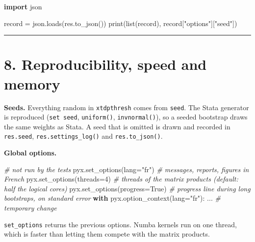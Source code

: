 \documentclass[
  10.5pt,
  a4paper,
]{article}
\newenvironment{Shaded}{}{}
\newcommand{\BuiltInTok}[1]{\textcolor[rgb]{0.00,0.50,0.00}{#1}}
\newcommand{\CommentTok}[1]{\textcolor[rgb]{0.38,0.63,0.69}{\textit{#1}}}
\newcommand{\ControlFlowTok}[1]{\textcolor[rgb]{0.00,0.44,0.13}{\textbf{#1}}}
\newcommand{\DecValTok}[1]{\textcolor[rgb]{0.25,0.63,0.44}{#1}}
\newcommand{\ImportTok}[1]{\textcolor[rgb]{0.00,0.50,0.00}{\textbf{#1}}}
\newcommand{\NormalTok}[1]{#1}
\newcommand{\OperatorTok}[1]{\textcolor[rgb]{0.40,0.40,0.40}{#1}}
\newcommand{\StringTok}[1]{\textcolor[rgb]{0.25,0.44,0.63}{#1}}
\newcommand{\VariableTok}[1]{\textcolor[rgb]{0.10,0.09,0.49}{#1}}
\begin{document}
\begin{Shaded}
\begin{Highlighting}[]
\ImportTok{import}\NormalTok{ json}

\NormalTok{record }\OperatorTok{=}\NormalTok{ json.loads(res.to\_json())}
\BuiltInTok{print}\NormalTok{(}\BuiltInTok{list}\NormalTok{(record), record[}\StringTok{"options"}\NormalTok{][}\StringTok{"seed"}\NormalTok{])}
\end{Highlighting}
\end{Shaded}

\begin{center}\rule{0.5\linewidth}{0.5pt}\end{center}

\section{8. Reproducibility, speed and
memory}\label{reproducibility-speed-and-memory}

\textbf{Seeds.} Everything random in \texttt{xtdpthresh} comes from
\texttt{seed}. The Stata generator is reproduced (\texttt{set\ seed},
\texttt{uniform()}, \texttt{invnormal()}), so a seeded bootstrap draws
the same weights as Stata. A seed that is omitted is drawn and recorded
in \texttt{res.seed}, \texttt{res.settings\_log()} and
\texttt{res.to\_json()}.

\textbf{Global options.}

\begin{Shaded}
\begin{Highlighting}[]
\CommentTok{\# not run by the tests}
\NormalTok{pyx.set\_options(lang}\OperatorTok{=}\StringTok{"fr"}\NormalTok{)  }\CommentTok{\# messages, reports, figures in French}
\NormalTok{pyx.set\_options(threads}\OperatorTok{=}\DecValTok{4}\NormalTok{)  }\CommentTok{\# threads of the matrix products (default: half the logical cores)}
\NormalTok{pyx.set\_options(progress}\OperatorTok{=}\VariableTok{True}\NormalTok{)  }\CommentTok{\# progress line during long bootstraps, on standard error}
\ControlFlowTok{with}\NormalTok{ pyx.option\_context(lang}\OperatorTok{=}\StringTok{"fr"}\NormalTok{):}
\NormalTok{    ...  }\CommentTok{\# temporary change}
\end{Highlighting}
\end{Shaded}

\texttt{set\_options} returns the previous options. Numba kernels run on
one thread, which is faster than letting them compete with the matrix
products.
\end{document}
